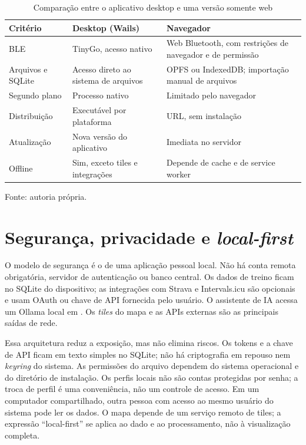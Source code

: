 \begin{table}[H]
    \centering
    \caption{Comparação entre o aplicativo desktop e uma versão somente web}
    \label{tab:desktop-browser}
    \small
    \begin{tabular}{@{}>{\raggedright\arraybackslash}p{3.0cm}
        >{\raggedright\arraybackslash}p{5.0cm}
        >{\raggedright\arraybackslash}p{5.0cm}@{}}
        \toprule
        \textbf{Critério} & \textbf{Desktop (Wails)} & \textbf{Navegador} \\
        \midrule
        BLE & TinyGo, acesso nativo & Web Bluetooth, com restrições de
        navegador e de permissão \\
        Arquivos e SQLite & Acesso direto ao sistema de arquivos & OPFS ou
        IndexedDB; importação manual de arquivos \\
        Segundo plano & Processo nativo & Limitado pelo navegador \\
        Distribuição & Executável por plataforma & URL, sem instalação \\
        Atualização & Nova versão do aplicativo & Imediata no servidor \\
        Offline & Sim, exceto tiles e integrações & Depende de cache e de
        service worker \\
        \bottomrule
    \end{tabular}
    \vspace{0.2cm}
    \par\small Fonte: autoria própria.
\end{table}

\section{Segurança, privacidade e \textit{local-first}}
\label{sec:seguranca}

O modelo de segurança é o de uma aplicação pessoal local. Não há conta remota
obrigatória, servidor de autenticação ou banco central. Os dados de treino ficam
no SQLite do dispositivo; as integrações com Strava e Intervals.icu são opcionais
e usam OAuth ou chave de API fornecida pelo usuário. O assistente de IA acessa
um Ollama local em . Os \textit{tiles} do mapa e as APIs
externas são as principais saídas de rede.

Essa arquitetura reduz a exposição, mas não elimina riscos. Os tokens e a chave
de API ficam em texto simples no SQLite; não há criptografia em repouso nem
\textit{keyring} do sistema. As permissões do arquivo dependem do sistema
operacional e do diretório de instalação. Os perfis locais não são contas
protegidas por senha; a troca de perfil é uma conveniência, não um controle de
acesso. Em um computador compartilhado, outra pessoa com acesso ao mesmo
usuário do sistema pode ler os dados. O mapa depende de um serviço remoto de
tiles; a expressão ``local-first'' se aplica ao dado e ao processamento, não à
visualização completa.

